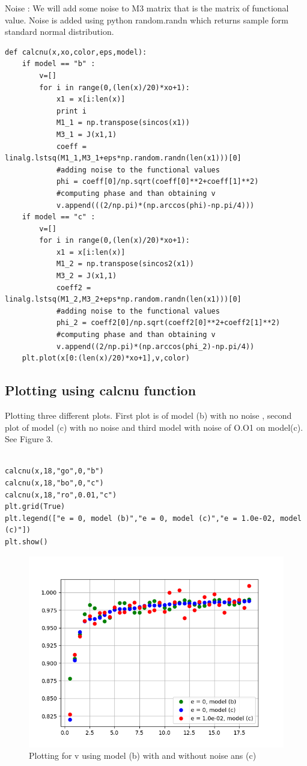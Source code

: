 \documentclass[a4paper]{article}
\begin{document}
Noise : We will add some noise to M3 matrix that is the matrix of functional value. Noise is added using python random.randn which returns sample form standard normal distribution. 
\begin{lstlisting}
def calcnu(x,xo,color,eps,model):
	if model == "b" :
		v=[]
		for i in range(0,(len(x)/20)*xo+1):
			x1 = x[i:len(x)]
			print i	
			M1_1 = np.transpose(sincos(x1))
			M3_1 = J(x1,1)
			coeff = linalg.lstsq(M1_1,M3_1+eps*np.random.randn(len(x1)))[0] 
			#adding noise to the functional values
			phi = coeff[0]/np.sqrt(coeff[0]**2+coeff[1]**2)
			#computing phase and than obtaining v
			v.append(((2/np.pi)*(np.arccos(phi)-np.pi/4)))
	if model == "c" :
		v=[]
		for i in range(0,(len(x)/20)*xo+1):
			x1 = x[i:len(x)]
			M1_2 = np.transpose(sincos2(x1))
			M3_2 = J(x1,1)
			coeff2 = linalg.lstsq(M1_2,M3_2+eps*np.random.randn(len(x1)))[0] 
			#adding noise to the functional values
			phi_2 = coeff2[0]/np.sqrt(coeff2[0]**2+coeff2[1]**2)
			#computing phase and than obtaining v
			v.append((2/np.pi)*(np.arccos(phi_2)-np.pi/4))
	plt.plot(x[0:(len(x)/20)*xo+1],v,color)

\end{lstlisting}

\subsection{Plotting using calcnu function}

Plotting three different plots. First plot is of model (b) with no noise , second plot of model (c) with no noise and third model with noise of O.O1 on model(c). See Figure 3.

\begin{lstlisting}
	
calcnu(x,18,"go",0,"b")
calcnu(x,18,"bo",0,"c")
calcnu(x,18,"ro",0.01,"c")
plt.grid(True)
plt.legend(["e = 0, model (b)","e = 0, model (c)","e = 1.0e-02, model (c)"])
plt.show()

\end{lstlisting}
\begin{figure}
\includegraphics[width=\columnwidth]{Figure_1-2.png}
\caption{Plotting for v using model (b) with and without noise ans (c)}
\end{figure}
\end{document}
